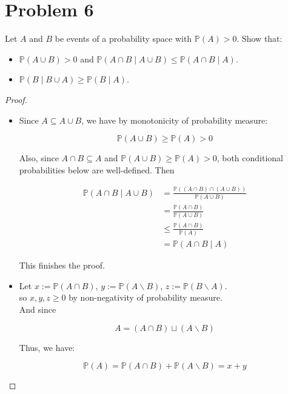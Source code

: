 \documentclass{qlnotes-export}
\begin{document}
\section{Problem 6}\label{problem-6-1}

Let \(A\) and \(B\) be events of a probability space with \({\mathbb{P}}(A) > 0\). Show that:

\begin{itemize}
\item
  \({\mathbb{P}}(A \cup B) > 0\) and \({\mathbb{P}}(A \cap B \mid A \cup B) \leq {\mathbb{P}}(A \cap B \mid A)\).
\item
  \({\mathbb{P}}(B \mid B \cup A) \geq {\mathbb{P}}(B \mid A)\).
\end{itemize}

\begin{proof}

\begin{itemize}
\item
  Since \(A \subseteq A \cup B\), we have by monotonicity of probability measure:

  \[{\mathbb{P}}(A \cup B) \geq {\mathbb{P}}(A) > 0\]

  Also, since \(A \cap B \subseteq A\) and \({\mathbb{P}}(A \cup B) \geq {\mathbb{P}}(A) > 0\), both conditional probabilities below are well-defined. Then

  \[\begin{matrix}
  {{\mathbb{P}}(A \cap B \mid A \cup B)} & {= \frac{{\mathbb{P}}((A \cap B) \cap (A \cup B))}{{\mathbb{P}}(A \cup B)}} \\
   & {= \frac{{\mathbb{P}}(A \cap B)}{{\mathbb{P}}(A \cup B)}} \\
   & {\leq \frac{{\mathbb{P}}(A \cap B)}{{\mathbb{P}}(A)}} \\
   & {= {\mathbb{P}}(A \cap B \mid A)}
  \end{matrix}\]

  This finishes the proof.
\item
  Let \(x := {\mathbb{P}}(A \cap B)\), \(y := {\mathbb{P}}(A\backslash B)\), \(z := {\mathbb{P}}(B\backslash A)\).\\
  so \(x,y,z \geq 0\) by non-negativity of probability measure.\\
  And since

  \[A = (A \cap B) \sqcup (A\backslash B)\]

  Thus, we have:

  \[{\mathbb{P}}(A) = {\mathbb{P}}(A \cap B) + {\mathbb{P}}(A\backslash B) = x + y\]


\end{itemize}
\end{proof}
\end{document}
